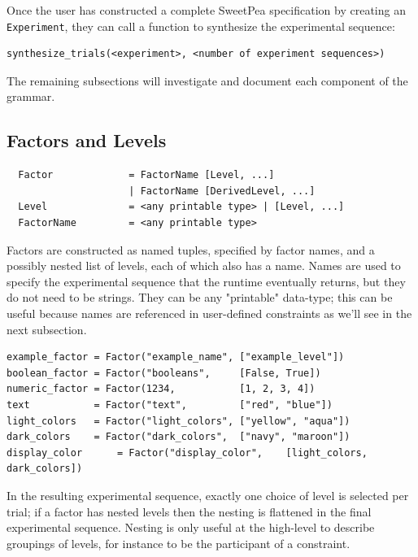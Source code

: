 Once the user has constructed a complete SweetPea specification by creating an \texttt{Experiment}, they can call a function to synthesize the experimental sequence:

\begin{verbatim}
synthesize_trials(<experiment>, <number of experiment sequences>)
\end{verbatim}

The remaining subsections will investigate and document each component of the grammar.

\subsection{Factors and Levels}

\begin{verbatim}
  Factor             = FactorName [Level, ...]
                     | FactorName [DerivedLevel, ...]
  Level              = <any printable type> | [Level, ...]
  FactorName         = <any printable type>
\end{verbatim}

Factors are constructed as named tuples, specified by factor names, and a possibly nested list of levels, each of which also has a name. Names are used to specify the experimental sequence that the runtime eventually returns, but they do not need to be strings. They can be any "printable" data-type; this can be useful because names are referenced in user-defined constraints as we'll see in the next subsection.

\begin{verbatim}
example_factor = Factor("example_name", ["example_level"])
boolean_factor = Factor("booleans",     [False, True])
numeric_factor = Factor(1234,           [1, 2, 3, 4])
text           = Factor("text",         ["red", "blue"])
light_colors   = Factor("light_colors", ["yellow", "aqua"])
dark_colors    = Factor("dark_colors",  ["navy", "maroon"])
display_color      = Factor("display_color",    [light_colors, dark_colors])
\end{verbatim}

In the resulting experimental sequence, exactly one choice of level is selected per trial; if a factor has nested levels then the nesting is flattened in the final experimental sequence. Nesting is only useful at the high-level to describe groupings of levels, for instance to be the participant of a constraint.

